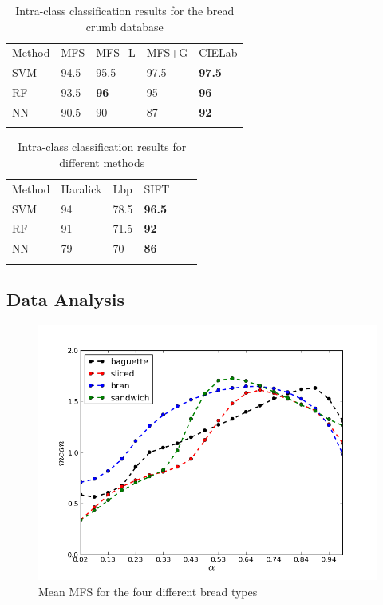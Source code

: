 \begin{table}
\caption{Intra-class classification results for the bread crumb database}
\label{tab:mfs}       %
\begin{tabular}{lllll}
\hline\noalign{\smallskip}
Method & MFS & MFS+L & MFS+G & CIELab  \\
\noalign{\smallskip}\hline\noalign{\smallskip}
SVM & 94.5 & 95.5 & 97.5 & \textbf{97.5} \\
RF  & 93.5 & \textbf{96} & 95 & \textbf{96} \\
NN & 90.5 & 90 & 87 & \textbf{92} \\
\noalign{\smallskip}\hline
\end{tabular}
\end{table}


\begin{table}
\caption{Intra-class classification results for different methods}
\label{tab:other}       %
\begin{tabular}{llllll}
\hline\noalign{\smallskip}
Method & Haralick & Lbp & SIFT\\ %
\noalign{\smallskip}\hline\noalign{\smallskip}
SVM & 94 & 78.5 & \textbf{96.5} \\ %
RF  & 91 & 71.5 & \textbf{92} \\ %
NN & 79 & 70 & \textbf{86} \\ %
\noalign{\smallskip}\hline
\end{tabular}
\end{table}



\subsection{Data Analysis}
\label{sec:11}

\begin{figure}[htb]
\centering
\includegraphics[scale=0.5]{../images/means}
\caption{Mean MFS for the four different bread types}
\label{fig:meansMFS}
\end{figure}

